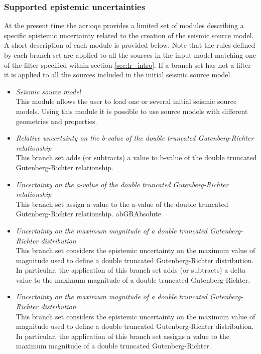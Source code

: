 \subsubsection{Supported epistemic uncertainties}
At the present time the \gls{acr:oqe} provides a limited set of modules 
describing a specific epistemic uncertainty related to the creation of 
the seismic source model.
%
A short description of each module is provided below. Note that the rules 
defined by each branch set are applied to all the sources in the input model
matching one of the filter specified within section \ref{sec:lr_intro}. 
If a branch set has not a filter it is applied to all the sources included 
in the initial seismic source model.
\begin{itemize}
    \item \emph{Seismic source model} \hfill \\
        This module allows the user to load one or several initial seismic 
        source models. Using this module it is possible to use source 
        models with different geometries and properties.
    \item \emph{Relative uncertainty on the b-value of the double truncated 
        Gutenberg-Richter relationship} \hfill \\
        This branch set adds (or subtracts) a value to b-value of the double 
        truncated Gutenberg-Richter relationship.
    \item \emph{Uncertainty on the a-value of the double 
        truncated Gutenberg-Richter relationship} \hfill \\ 
        This branch set assign a value to the a-value of the double truncated 
        Gutenberg-Richter relationship.
        abGRAbsolute
    \item \emph{Uncertainty on the maximum magnitude of a double 
        truncated Gutenberg-Richter distribution} \hfill \\ 
        This branch set considers the epistemic uncertainty on the maximum 
        value of magnitude used to define a double truncated Gutenberg-Richter 
        distribution. In particular, the application of this branch set adds 
        (or subtracts) a delta value to the maximum magnitude of a double 
        truncated Gutenberg-Richter.
   \item \emph{Uncertainty on the maximum magnitude of a double 
        truncated Gutenberg-Richter distribution} \hfill \\ 
        This branch set considers the epistemic uncertainty on the maximum 
        value of magnitude used to define a double truncated Gutenberg-Richter 
        distribution. In particular, the application of this branch set  
        assigns a value to the maximum magnitude of a double truncated 
        Gutenberg-Richter.
\end{itemize}
%
